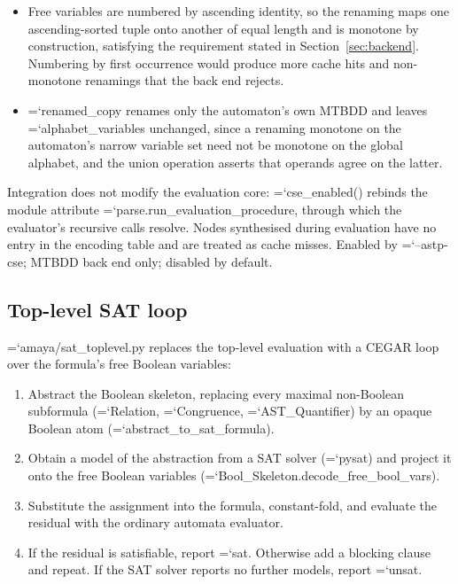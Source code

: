 \documentclass[10pt,a4paper]{article}
\newcommand{\code}[1]{{\small\ttfamily\hyphenchar\font=`\-\relax #1}}
\begin{document}
\begin{itemize}
  \item Free variables are numbered by ascending identity, so the renaming maps one ascending-sorted
        tuple onto another of equal length and is monotone by construction, satisfying the requirement
        stated in Section~\ref{sec:backend}.  Numbering by first occurrence would produce more cache
        hits and non-monotone renamings that the back end rejects.
  \item \code{renamed\_copy} renames only the automaton's own MTBDD and leaves
        \code{alphabet\_variables} unchanged, since a renaming monotone on the automaton's narrow
        variable set need not be monotone on the global alphabet, and the union operation asserts that
        operands agree on the latter.
\end{itemize}

Integration does not modify the evaluation core: \code{cse\_enabled()} rebinds the module attribute
\code{parse.\allowbreak run\_evaluation\_procedure}, through which the evaluator's recursive calls resolve.  Nodes
synthesised during evaluation have no entry in the encoding table and are treated as cache misses.
Enabled by \code{--astp-cse}; MTBDD back end only; disabled by default.

\subsection{Top-level SAT loop}
\label{sec:toplevel-sat}

\code{amaya/sat\_toplevel.py} replaces the top-level evaluation with a CEGAR loop over the formula's
free Boolean variables:

\begin{enumerate}
  \item Abstract the Boolean skeleton, replacing every maximal non-Boolean subformula (\code{Relation},
        \code{Congruence}, \code{AST\_Quantifier}) by an opaque Boolean atom
        (\code{abstract\_to\_sat\_formula}).
  \item Obtain a model of the abstraction from a SAT solver (\code{pysat}) and project it onto the free
        Boolean variables (\code{Bool\_\allowbreak Skeleton.\allowbreak decode\_\allowbreak free\_\allowbreak bool\_\allowbreak vars}).
  \item Substitute the assignment into the formula, constant-fold, and evaluate the residual with the
        ordinary automata evaluator.
  \item If the residual is satisfiable, report \code{sat}.  Otherwise add a blocking clause and repeat.
        If the SAT solver reports no further models, report \code{unsat}.
\end{enumerate}
\end{document}
